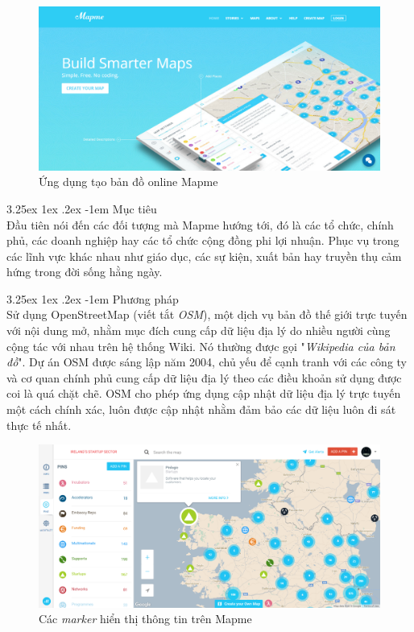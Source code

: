 \documentclass[12pt,a4paper,twoside]{article}
\makeatletter
\newcommand{\myparagraph}[1]{\paragraph{#1}\mbox{}\\} %
\renewcommand\paragraph{\@startsection{paragraph}{5}{\z@}%
  {3.25ex \@plus1ex \@minus.2ex}%
  {-1em}%
  {\normalfont\normalsize\bfseries}}
\makeatother
\begin{document}
\begin{figure}[!h]
	\begin{center}
    \includegraphics[scale=.4]{image/mapme}
    \caption{Ứng dụng tạo bản đồ online Mapme}
    \label{fig:mapme}
    \end{center}
\end{figure}

\myparagraph{Mục tiêu}
Đầu tiên nói đến các đối tượng mà Mapme hướng tới, đó là các tổ chức, chính phủ, các doanh nghiệp hay các tổ chức cộng đồng phi lợi nhuận. Phục vụ trong các lĩnh vực khác nhau như giáo dục, các sự kiện, xuất bản hay truyền thụ cảm hứng trong đời sống hằng ngày.

\myparagraph{Phương pháp}
Sử dụng OpenStreetMap (viết tắt \textit{OSM})\cite{osm}, một dịch vụ bản đồ thế giới trực tuyến với nội dung mở, nhằm mục đích cung cấp dữ liệu địa lý do nhiều người cùng cộng tác với nhau trên hệ thống Wiki. Nó thường được gọi "\textit{Wikipedia của bản đồ}". Dự án OSM được sáng lập năm 2004, chủ yếu để cạnh tranh với các công ty và cơ quan chính phủ cung cấp dữ liệu địa lý theo các điều khoản sử dụng được coi là quá chặt chẽ. OSM cho phép ứng dụng cập nhật dữ liệu địa lý trực tuyến một cách chính xác, luôn được cập nhật nhằm đảm bảo các dữ liệu luôn đi sát thực tế nhất.

\begin{figure}[!h]
	\begin{center}
    \includegraphics[scale=.4]{image/mapmeOSM}
    \caption{Các \textit{marker} hiển thị thông tin trên Mapme}
    \label{fig:mapmeOSM}
	\end{center}
\end{figure}
\end{document}
